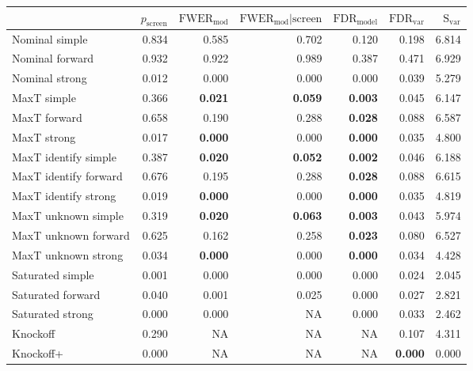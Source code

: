 
\newcommand{\guarantee}[1]{{\bf #1}}
\begin{tabular}{|l|rrrrrr|}
 \hline
{} &  $p_{\text{screen}}$ &  $\text{FWER}_{\text{mod}}$ &  $\text{FWER}_{\text{mod}} \vert \text{screen}$ &  $\text{FDR}_{\text{model}}$ &  $\text{FDR}_{\text{var}}$ &  $\text{S}_{\text{var}}$ \\ \hline
Nominal simple & 0.834 & 0.585 & 0.702 & 0.120 & 0.198 & 6.814 \\ 
Nominal forward & 0.932 & 0.922 & 0.989 & 0.387 & 0.471 & 6.929 \\ 
Nominal strong & 0.012 & 0.000 & 0.000 & 0.000 & 0.039 & 5.279 \\ 
MaxT simple & 0.366 & \guarantee{0.021} & \guarantee{0.059} & \guarantee{0.003} & 0.045 & 6.147 \\ 
MaxT forward & 0.658 & 0.190 & 0.288 & \guarantee{0.028} & 0.088 & 6.587 \\ 
MaxT strong & 0.017 & \guarantee{0.000} & 0.000 & \guarantee{0.000} & 0.035 & 4.800 \\ 
MaxT identify simple & 0.387 & \guarantee{0.020} & \guarantee{0.052} & \guarantee{0.002} & 0.046 & 6.188 \\ 
MaxT identify forward & 0.676 & 0.195 & 0.288 & \guarantee{0.028} & 0.088 & 6.615 \\ 
MaxT identify strong & 0.019 & \guarantee{0.000} & 0.000 & \guarantee{0.000} & 0.035 & 4.819 \\ 
MaxT unknown simple & 0.319 & \guarantee{0.020} & \guarantee{0.063} & \guarantee{0.003} & 0.043 & 5.974 \\ 
MaxT unknown forward & 0.625 & 0.162 & 0.258 & \guarantee{0.023} & 0.080 & 6.527 \\ 
MaxT unknown strong & 0.034 & \guarantee{0.000} & 0.000 & \guarantee{0.000} & 0.034 & 4.428 \\ 
Saturated simple & 0.001 & 0.000 & 0.000 & 0.000 & 0.024 & 2.045 \\ 
Saturated forward & 0.040 & 0.001 & 0.025 & 0.000 & 0.027 & 2.821 \\ 
Saturated strong & 0.000 & 0.000 & NA & 0.000 & 0.033 & 2.462 \\ 
Knockoff & 0.290 & NA & NA & NA & 0.107 & 4.311 \\ 
Knockoff+ & 0.000 & NA & NA & NA & \guarantee{0.000} & 0.000 \\   \hline
\end{tabular}
